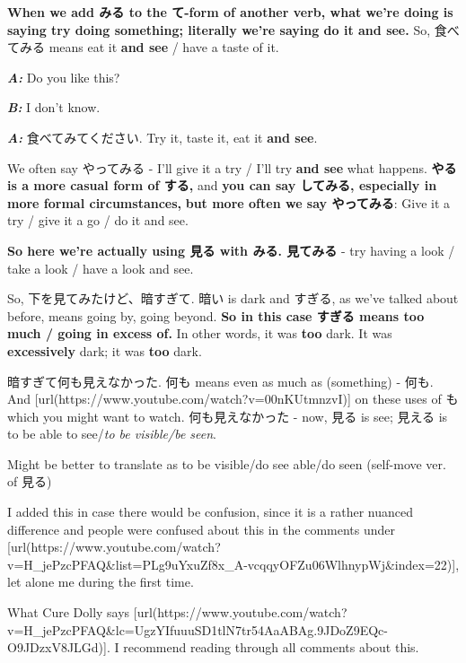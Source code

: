 \startsectionlevel[title={-てみる / -て見る},reference={てみる--て見る}]

{\bf When we add みる to the て-form of another verb, what we're doing is saying try doing something; literally we're saying do it and see.} So, 食べてみる means eat it {\bf and see} / have a taste of it.　

{\bf {\em A:}} Do you like this?　

{\bf {\em B:}} I don't know.　

{\bf {\em A:}} 食べてみてください. Try it, taste it, eat it {\bf and see}.

We often say やってみる - I'll give it a try / I'll try {\bf and see} what happens. {\bf やる is a more casual form of する,} and {\bf you can say してみる, especially in more formal circumstances,} {\bf but more often we say やってみる}: Give it a try / give it a go / do it and see.

{}

{\bf So here we're actually using 見る with みる. 見てみる} - try having a look / take a look / have a look and see.

So, 下を見てみたけど、暗すぎて. 暗い is dark and すぎる, as we've talked about before, means going by, going beyond. {\bf So in this case すぎる means too much / going in excess of.} In other words, it was {\bf too} dark. It was {\bf excessively} dark; it was {\bf too} dark.

{}

暗すぎて何も見えなかった. 何も means even as much as (something) - 何も. And [url(https://www.youtube.com/watch?v=00nKUtmnzvI)] on these uses of も which you might want to watch. 何も見えなかった - now, 見る is see; 見える is to be able to see/{\em to be visible/be seen}.

Might be better to translate as to be visible/do see able/do seen (self-move ver. of 見る)

I added this in case there would be confusion, since it is a rather nuanced difference and people were confused about this in the comments under [url(https://www.youtube.com/watch?v=H_jePzcPFAQ&list=PLg9uYxuZf8x_A-vcqqyOFZu06WlhnypWj&index=22)], let alone me during the first time.

What Cure Dolly says [url(https://www.youtube.com/watch?v=H_jePzcPFAQ&lc=UgzYIfuuuSD1tlN7tr54AaABAg.9JDoZ9EQc-O9JDzxV8JLGd)]. I recommend reading through all comments about this.

